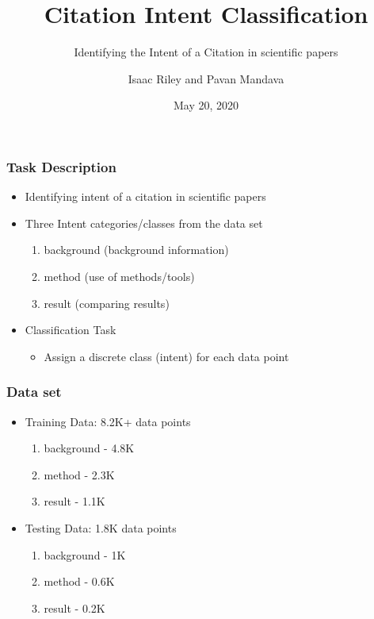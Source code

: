 \documentclass[
  xcolor={svgnames},
  hyperref={colorlinks,citecolor=DeepPink4,linkcolor=DarkRed,urlcolor=DarkBlue}
  ]{beamer}
\title[] %
{Citation Intent Classification}
\subtitle{Identifying the Intent of a Citation in scientific papers}
\author[tmip, hieutt] %
{Isaac Riley and Pavan Mandava}
\institute[Universities Here and There] %
{
  \inst{1}%
  Computational Linguistics, M.Sc.\\
  \and
  \inst{2}%
  Computational Linguistics, M.Sc.\\
}
\date[] %
{May 20, 2020}
\begin{document}
\begin{frame}
\titlepage
\end{frame}


\begin{frame}
\frametitle{Task Description}

\begin{itemize}

\item Identifying intent of a citation in scientific papers
\item Three Intent categories/classes from the data set
	\begin{enumerate}
		\item background (background information)
		\item method (use of methods/tools)
		\item result (comparing results)
	\end{enumerate}
\item Classification Task 
	\begin{itemize}
		\item Assign a discrete class (intent) for each data point
	\end{itemize}
\end{itemize}

\end{frame}

\begin{frame}
\frametitle{Data set}

\begin{itemize}

\item Training Data: 8.2K+ data points
	\begin{enumerate}
		\item background - 4.8K
		\item method - 2.3K
		\item result - 1.1K
	\end{enumerate}
\item Testing Data: 1.8K data points
	\begin{enumerate}
		\item background - 1K
		\item method - 0.6K
		\item result - 0.2K
	\end{enumerate}
\end{itemize}

\end{frame}
\end{document}
